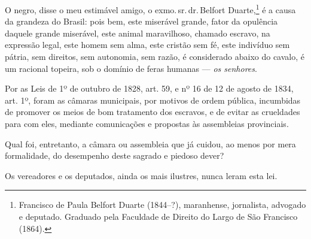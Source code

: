 O negro, disse o meu estimável amigo, o exmo.\,sr.\,dr.\,Belfort
Duarte,\footnote{Francisco de Paula Belfort Duarte (1844--?),
  maranhense, jornalista, advogado e deputado. Graduado pela Faculdade
  de Direito do Largo de São Francisco (1864).} é a causa da grandeza do
Brasil: pois bem, este miserável grande, fator da opulência daquele
grande miserável, este animal maravilhoso, chamado escravo, na expressão
legal, este homem sem alma, este cristão sem fé, este indivíduo sem
pátria, sem direitos, sem autonomia, sem razão, é considerado abaixo do
cavalo, é um racional topeira, sob o domínio de feras humanas ---
\emph{os senhores}.

Por as Leis de 1º de outubro de 1828, art. 59, e nº 16 de 12 de agosto
de 1834, art. 1º, foram as câmaras municipais, por motivos de ordem
pública, incumbidas de promover os meios de bom tratamento dos escravos,
e de evitar as crueldades para com eles, mediante comunicações e
propostas às assembleias provinciais.

Qual foi, entretanto, a câmara ou assembleia que já cuidou, ao menos por
mera formalidade, do desempenho deste sagrado e piedoso dever?

Os vereadores e os deputados, ainda os mais ilustres, nunca leram esta
lei.



